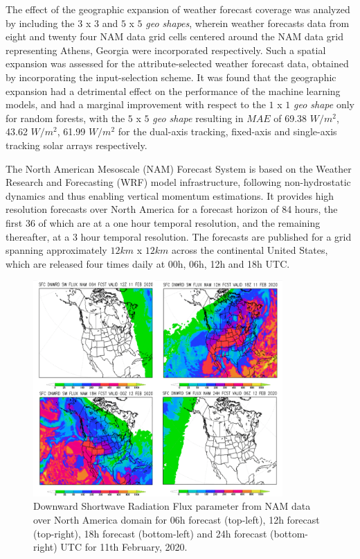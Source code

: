 \par The effect of the geographic expansion of weather forecast coverage was analyzed by including the $3$ x $3$ and $5$ x $5$ \textit{geo shapes}, wherein weather forecasts data from eight and twenty four NAM data grid cells centered around the NAM data grid representing Athens, Georgia were incorporated respectively. Such a spatial expansion was assessed for the attribute-selected weather forecast data, obtained by incorporating the input-selection scheme. It was found that the geographic expansion had a detrimental effect on the performance of the machine learning models, and had a marginal improvement with respect to the $1$ x $1$ \textit{geo shape} only for random forests, with the $5$ x $5$ \textit{geo shape} resulting in $MAE$ of 69.38 $W/m^2$, 43.62 $W/m^2$, 61.99 $W/m^2$ for the dual-axis tracking, fixed-axis and single-axis tracking solar arrays respectively.

\par The North American Mesoscale (NAM) Forecast System is based on the Weather Research and Forecasting (WRF) model infrastructure, following non-hydrostatic dynamics and thus enabling vertical momentum estimations. It provides high resolution forecasts over North America for a forecast horizon of 84 hours, the first 36 of which are at a one hour temporal resolution, and the remaining thereafter, at a 3 hour temporal resolution. The forecasts are published for a grid spanning approximately $12km$ x $12 km$ across the continental United States, which are released four times daily at 00h, 06h, 12h and 18h UTC.

\begin{figure}[ht]
    \begin{center}
    	\includegraphics[width=0.85\textwidth]{chapter3/fig_nam_dswrf.png}
    	\caption[Downward shortwave radiation flux parameter for 06h, 12h, 18h, 24h UTC forecasts in a day for NAM Forecast System]{Downward Shortwave Radiation Flux parameter from NAM data over North America domain for 06h forecast (top-left), 12h forecast (top-right), 18h forecast (bottom-left) and 24h forecast (bottom-right) UTC for 11th February, 2020.}
    	\label{fig:fig_nam_dswrf}
    \end{center}
\end{figure}

